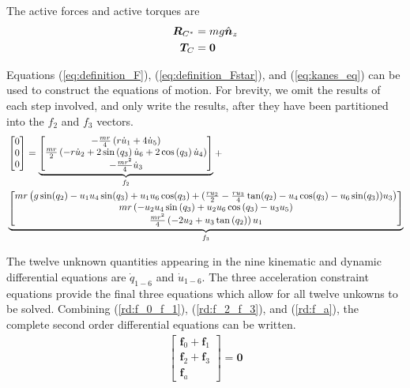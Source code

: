 The active forces and active torques are
\begin{align}
  \boldsymbol{R}_{C^*} &= m g \hat{\boldsymbol{n}}_{z} \\
  \boldsymbol{T}_C &= \boldsymbol{0}
\end{align}

Equations (\ref{eq:definition_F}), (\ref{eq:definition_Fstar}), and
(\ref{eq:kanes_eq}) can be used to construct the equations of motion.  For
brevity, we omit the results of each step involved, and only write the results,
after they have been partitioned into the $f_2$ and $f_3$ vectors.
\begin{align}
    \label{rd:f_2_f_3}
    & \left[\begin{matrix} 0\\ 0\\ 0\end{matrix}\right] =
    \underbrace{\left[\begin{matrix}- \frac{m r}{4} \left(r \dot{u}_{1} + 4
                \dot{u}_{5}\right)\\\frac{m r}{2} \left(- r \dot{u}_{2} + 2
                \sin\left(q_{3}\right) \dot{u}_{6} + 2 \cos\left(q_{3}\right)
                \dot{u}_{4}\right)\\- \frac{m r^{2}}{4}
                \dot{u}_{3}\end{matrix}\right]}_{f_2} + \notag\\
    &\underbrace{\left[\begin{matrix}
                m r \left( g \sin(q_2) - u_1 u_4 \sin(q_3) + u_1 u_6 \cos(q_3)
                    + (\frac{r u_2}{2} - \frac{r u_3}{4} \tan(q_2) - u_4
                \cos(q_3) - u_6 \sin(q_3)) u_3 \right)
                \\m r \left(- u_{2} u_{4}
                \sin\left(q_{3}\right) + u_{2} u_{6}
                \cos\left(q_{3}\right) - u_{3} u_{5}\right)\\\frac{m r^{2}}{4}
                \left(- 2 u_{2} + u_{3} \tan\left(q_{2}\right)\right)
                u_{1}\end{matrix}\right]}_{f_3} 
\end{align}

The twelve unknown quantities appearing in the nine kinematic and dynamic
differential equations are $\dot{q}_{1-6}$ and $\dot{u}_{1-6}$. The three
acceleration constraint equations provide the final three equations which allow
for all twelve unkowns to be solved. Combining (\ref{rd:f_0_f_1}),
(\ref{rd:f_2_f_3}), and (\ref{rd:f_a}), the complete second order differential
equations can be written.
\begin{align}
\label{rd:ode}
\begin{bmatrix} \mathbf{f}_0 + \mathbf{f}_1\\
                \mathbf{f}_2 + \mathbf{f}_3\\
                \mathbf{f}_a \end{bmatrix} = \mathbf{0}
\end{align}

